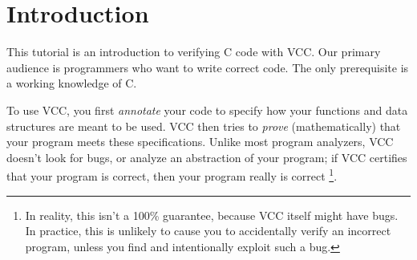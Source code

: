 \section{Introduction}
This tutorial is an introduction to verifying C code with VCC. Our
primary audience is programmers who want to write correct code.
The only prerequisite is a working knowledge of C.

To use VCC, you first \emph{annotate} your code to specify how
your functions and data structures are meant to be used.
VCC then tries to \emph{prove} (mathematically) that
your program meets these specifications.  Unlike most program
analyzers, VCC doesn't look for bugs, or analyze an abstraction of
your program; if VCC certifies that your program is correct, then your
program really is correct%
\footnote{
  In reality, this isn't a 100\% guarantee, because VCC itself might have bugs. In
  practice, this is unlikely to cause you to accidentally verify an
  incorrect program, unless you find and intentionally exploit such a
  bug. 

  }. 


